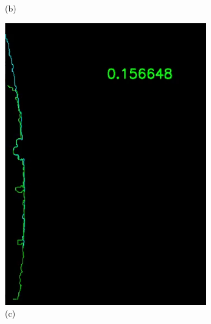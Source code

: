 \begin{figure}[h]
\begin{minipage}{0.24\textwidth}
        \caption*{(b)}
    \end{minipage}\hfill
    \begin{minipage}{0.24\textwidth}
        \centering
        \includegraphics[width=\textwidth]{images/stitching_match.PNG} %
        \caption*{(c)}
    \end{minipage}\hfill
    \begin{minipage}{0.24\textwidth}
        \centering

\end{minipage}
\end{figure}
